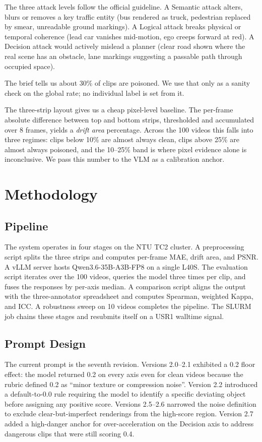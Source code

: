 \documentclass[letterpaper]{article}
\begin{document}
The three attack levels follow the official guideline. A Semantic
attack alters, blurs or removes a key traffic entity (bus rendered as
truck, pedestrian replaced by smear, unreadable ground markings). A
Logical attack breaks physical or temporal coherence (lead car vanishes
mid-motion, ego creeps forward at red). A Decision attack would
actively mislead a planner (clear road shown where the real scene has
an obstacle, lane markings suggesting a passable path through occupied
space).

The brief tells us about 30\% of clips are poisoned. We use that only
as a sanity check on the global rate; no individual label is set from it.

The three-strip layout gives us a cheap pixel-level baseline. The
per-frame absolute difference between top and bottom strips,
thresholded and accumulated over 8 frames, yields a \emph{drift area}
percentage. Across the 100 videos this falls into three regimes: clips
below 10\% are almost always clean, clips above 25\% are almost always
poisoned, and the 10--25\% band is where pixel evidence alone is
inconclusive. We pass this number to the VLM as a calibration anchor.

\section{Methodology}
\subsection{Pipeline}
The system operates in four stages on the NTU TC2 cluster. A
preprocessing script splits the three strips and computes per-frame
MAE, drift area, and PSNR. A vLLM server hosts Qwen3.6-35B-A3B-FP8
on a single L40S. The evaluation script iterates over the 100 videos,
queries the model three times per clip, and fuses the responses by
per-axis median. A comparison script aligns the output with the
three-annotator spreadsheet and computes Spearman, weighted Kappa,
and ICC. A robustness sweep on 10 videos completes the pipeline. The
SLURM job chains these stages and resubmits itself on a USR1
walltime signal.

\subsection{Prompt Design}
The current prompt is the seventh revision. Versions 2.0--2.1
exhibited a 0.2 floor effect: the model returned 0.2 on every axis
even for clean videos because the rubric defined 0.2 as ``minor
texture or compression noise''. Version 2.2 introduced a
default-to-0.0 rule requiring the model to identify a specific
deviating object before assigning any positive score. Versions
2.5--2.6 narrowed the noise definition to exclude
clear-but-imperfect renderings from the high-score region. Version
2.7 added a high-danger anchor for over-acceleration on the Decision
axis to address dangerous clips that were still scoring 0.4.
\end{document}

